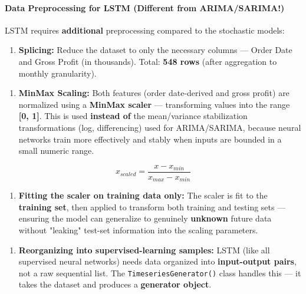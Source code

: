 \documentclass[12pt,openany]{book}
\begin{document}
\paragraph{Data Preprocessing for LSTM (Different from ARIMA/SARIMA!)}

LSTM requires \textbf{additional} preprocessing compared to the stochastic models:

\begin{enumerate}[leftmargin=*]
    \item \textbf{Splicing:} Reduce the dataset to only the necessary columns --- Order Date and Gross Profit (in thousands). Total: \textbf{548 rows} (after aggregation to monthly granularity).
\end{enumerate}

\begin{enumerate}[leftmargin=*]
    \item \textbf{MinMax Scaling:} Both features (order date-derived and gross profit) are normalized using a \textbf{MinMax scaler} --- transforming values into the range \textbf{[0, 1]}. This is used \textbf{instead of} the mean/variance stabilization transformations (log, differencing) used for ARIMA/SARIMA, because neural networks train more effectively and stably when inputs are bounded in a small numeric range.
\end{enumerate}

\begin{equation*}
    x_{scaled} = \frac{x - x_{min}}{x_{max} - x_{min}}
\end{equation*}

\begin{enumerate}[leftmargin=*]
    \item \textbf{Fitting the scaler on training data only:} The scaler is fit to the \textbf{training set}, then applied to transform both training and testing sets --- ensuring the model can generalize to genuinely \textbf{unknown} future data without "leaking" test-set information into the scaling parameters.
\end{enumerate}

\begin{enumerate}[leftmargin=*]
    \item \textbf{Reorganizing into supervised-learning samples:} LSTM (like all supervised neural networks) needs data organized into \textbf{input-output pairs}, not a raw sequential list. The \texttt{TimeseriesGenerator()} class handles this --- it takes the dataset and produces a \textbf{generator object}.
\end{enumerate}
\end{document}
